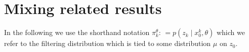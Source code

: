 \documentclass[twoside,11pt]{article}
\newcommand{\defn}{: \, = }
\begin{document}





\section{Mixing related results}

In the following we use the shorthand notation
$\pi_k^\theta \defn p(z_k \mid x_{0}^{k},\theta)$ which we refer to
the filtering distribution which is tied to some distribution $\mu$ on $z_0$. %
\end{document}
